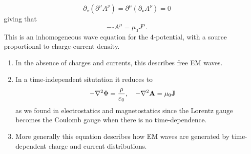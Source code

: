 \documentclass{article}
\begin{document}
\[
  \partial_\nu(\partial^\mu A^\nu) = \partial^\mu(\partial_\nu A^\nu) = 0
\]
giving that 
\[
  -\square A^\mu = \mu_0 J^\mu.
\]
This is an inhomogeneous wave equation for the 4-potential, with a source proportional to charge-current density.
\begin{enumerate}
	\item In the absence of charges and currents, this describes free EM waves.
	\item In a time-independent situtation it reduces to
		\[
			-\nabla^2 \Phi = \frac{\rho}{\varepsilon_0},\quad -\nabla^2\mathbf A = \mu_0 \mathbf J
		\]
		as we found in electrostatics and magnetostatics since the Lorentz gauge becomes the Coulomb gauge when there is no time-dependence.
	\item More generally this equation describes how EM waves are generated by time-dependent charge and current distributions. 
\end{enumerate}
\end{document}
